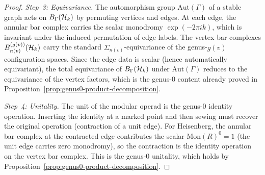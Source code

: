 \begin{proof}
\medskip\noindent
\emph{Step~3: Equivariance.}
The automorphism group $\mathrm{Aut}(\Gamma)$ of a
stable graph acts on $B_\Gamma(\mathcal{H}_k)$ by permuting
vertices and edges. At each edge, the annular bar
complex carries the scalar monodromy
$\exp(-2\pi ik)$, which is invariant under the induced
permutation of edge labels. The vertex bar complexes
$B^{(g(v))}_{n(v)}(\mathcal{H}_k)$ carry the standard
$\Sigma_{n(v)}$-equivariance of the genus-$g(v)$
configuration spaces. Since the edge data is
scalar (hence automatically equivariant), the total
equivariance of $B_\Gamma(\mathcal{H}_k)$ under
$\mathrm{Aut}(\Gamma)$ reduces to the equivariance
of the vertex factors, which is the genus-$0$ content
already proved in
Proposition~\ref{prop:genus0-product-decomposition}.

\medskip\noindent
\emph{Step~4: Unitality.}
The unit of the modular operad is the genus-$0$
identity operation. Inserting the identity at a
marked point and then sewing must recover the
original operation (contraction of a unit edge).
For Heisenberg, the annular bar complex at the
contracted edge contributes the scalar
$\mathrm{Mon}(R)^0 = 1$ (the unit edge carries zero
monodromy), so the contraction is the identity
operation on the vertex bar complex. This is the
genus-$0$ unitality, which holds by
Proposition~\ref{prop:genus0-product-decomposition}.
\end{proof}

